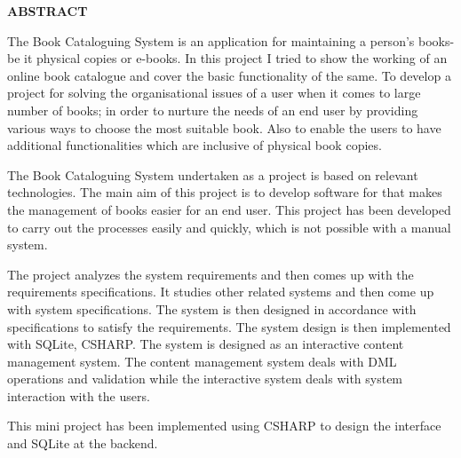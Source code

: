 \pagestyle{empty}
\begin{center}
\textup{\large{\textbf{ABSTRACT}}}
\end{center}

\justify
\indent
The Book Cataloguing System is an application for maintaining a person's books-be it physical copies or e-books. In this project I tried to show the working of an online book catalogue and cover the basic functionality of the same. To develop a project for solving the organisational issues of a user when it comes to large number of books; in order to nurture the needs of an end user by providing various ways to choose the most suitable book. Also to enable the users to have additional functionalities which are inclusive of physical book copies.


The Book Cataloguing System undertaken as a project is based on relevant technologies. The main aim of this project is to develop software for that makes the management of books easier for an end user. This project has been developed to carry out the processes easily and quickly, which is not possible with a manual system.


The project analyzes the system requirements and then comes up with the requirements specifications. It studies other related systems and then come up with system specifications. The system is then designed in accordance with specifications to satisfy the requirements. The system design is then implemented with SQLite, CSHARP. The system is designed as an interactive content management system. The content management system deals with DML operations and validation while the interactive system deals with system interaction with the users.


This mini project has been implemented using CSHARP to design the interface and SQLite at the backend.


\pagebreak

